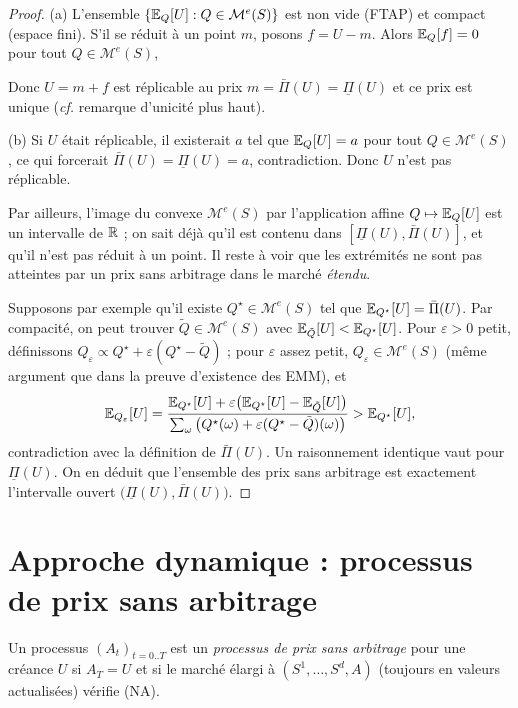 \begin{proof}
(a) L'ensemble $\{\mathbb{E}_Q[U]:Q\in\mathcal{M}^e(S)\}$ est non vide (FTAP) et compact (espace fini).
S'il se réduit à un point $m$, posons $f=U-m$. Alors $\mathbb{E}_Q[f]=0$ pour tout $Q\in\mathcal{M}^e(S)$,

Donc $U=m+f$ est réplicable au prix $m=\bar\Pi(U)=\underline{\Pi}(U)$ et ce prix est unique
(\emph{cf.} remarque d'unicité plus haut).

(b) Si $U$ était réplicable, il existerait $a$ tel que $\mathbb{E}_Q[U]=a$ pour tout $Q\in\mathcal{M}^e(S)$,
ce qui forcerait $\bar\Pi(U)=\underline{\Pi}(U)=a$, contradiction. Donc $U$ n'est pas réplicable.

Par ailleurs, l'image du convexe $\mathcal{M}^e(S)$ par l'application affine $Q\mapsto \mathbb{E}_Q[U]$
est un intervalle de $\mathbb{R}$ ; on sait déjà qu'il est contenu dans $[\underline{\Pi}(U),\bar\Pi(U)]$,
et qu'il n'est pas réduit à un point. Il reste à voir que les extrémités ne sont pas atteintes par un prix
sans arbitrage dans le marché \emph{étendu}.

Supposons par exemple qu'il existe $Q^\star\in\mathcal{M}^e(S)$ tel que
$\mathbb{E}_{Q^\star}[U]=\bar\Pi(U)$. Par compacité, on peut trouver $\tilde Q\in\mathcal{M}^e(S)$
avec $\mathbb{E}_{\tilde Q}[U]<\mathbb{E}_{Q^\star}[U]$. Pour $\varepsilon>0$ petit, définissons
$Q_\varepsilon \propto Q^\star+\varepsilon(Q^\star-\tilde Q)$ ; pour $\varepsilon$ assez petit,
$Q_\varepsilon\in\mathcal{M}^e(S)$ (même argument que dans la preuve d'existence des EMM),
et
\[
\mathbb{E}_{Q_\varepsilon}[U]
=\frac{\mathbb{E}_{Q^\star}[U]+\varepsilon\big(\mathbb{E}_{Q^\star}[U]-\mathbb{E}_{\tilde Q}[U]\big)}
      {\sum_\omega \big(Q^\star(\omega)+\varepsilon(Q^\star-\tilde Q)(\omega)\big)}
>\mathbb{E}_{Q^\star}[U],
\]
contradiction avec la définition de $\bar\Pi(U)$. Un raisonnement identique vaut pour $\underline{\Pi}(U)$.
On en déduit que l'ensemble des prix sans arbitrage est exactement l'intervalle ouvert
$\big(\underline{\Pi}(U),\bar\Pi(U)\big)$.
\end{proof}

\section{Approche dynamique : processus de prix sans arbitrage}

\begin{definition}\label{def:processus_prix_NA}
Un processus $(A_t)_{t=0..T}$ est un \emph{processus de prix sans arbitrage} pour une créance $U$
si $A_T=U$ et si le marché élargi à $(S^1,\dots,S^d,A)$ (toujours en valeurs actualisées)
vérifie (NA).
\end{definition}

